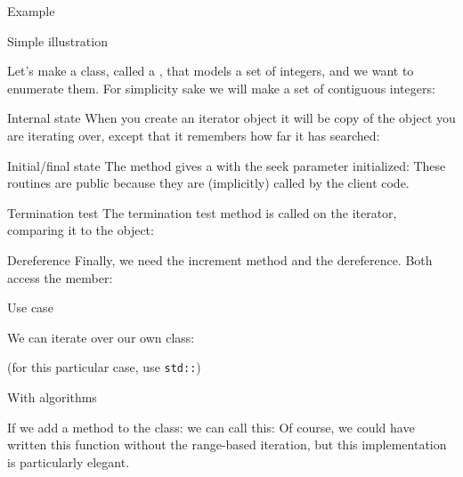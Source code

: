 {Example}

\begin{block}{Simple illustration}
  \label{sl:bagdata}
  
  Let's make a class, called a , that models a set of integers,
  and we want to enumerate them. For simplicity sake we will make a set
  of contiguous integers:
\end{block}

\begin{block}{Internal state}
  \label{sl:bagseek}
  When you create an iterator object it will be copy of the object you
  are iterating over, except that it remembers how far it has
  searched:
\end{block}

\begin{block}{Initial/final state}
  \label{sl:bagbeginend}
  The  method gives a  with the seek parameter
  initialized:
  These routines are public because they are (implicitly) called by the
  client code.
\end{block}

\begin{block}{Termination test}
  \label{sl:bagtest}
  The termination test method is called on the iterator, comparing it to
  the  object:
\end{block}

\begin{block}{Dereference}
  \label{sl:bagderef}
  Finally, we need the increment method and the dereference. Both access
  the  member:
\end{block}

\begin{block}{Use case}
  \label{sl:bagfind}

  We can iterate over our own class:

  (for this particular case, use \lstinline{std::})
\end{block}

\begin{block}{With algorithms}
  \label{sl:bagany}

\end{block}

If we add a method  to the class:
%
%
we can call this:
%
%
Of course, we could have written this function
without the range-based iteration, but this implementation is
particularly elegant.

